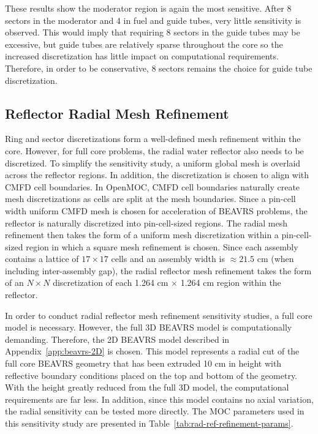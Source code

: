 These results show the moderator region is again the most sensitive. After 8 sectors in the moderator and 4 in fuel and guide tubes, very little sensitivity is observed. This would imply that requiring 8 sectors in the guide tubes may be excessive, but guide tubes are relatively sparse throughout the core so the increased discretization has little impact on computational requirements. Therefore, in order to be conservative, 8 sectors remains the choice for guide tube discretization.

\subsection{Reflector Radial Mesh Refinement}

Ring and sector discretizations form a well-defined mesh refinement within the core. However, for full core problems, the radial water reflector also needs to be discretized. To simplify the sensitivity study, a uniform global mesh is overlaid across the reflector regions. In addition, the discretization is chosen to align with \ac{CMFD} cell boundaries. In OpenMOC, \ac{CMFD} cell boundaries naturally create mesh discretizations as cells are split at the mesh boundaries. Since a pin-cell width uniform \ac{CMFD} mesh is chosen for acceleration of BEAVRS problems, the reflector is naturally discretized into pin-cell-sized regions. The radial mesh refinement then takes the form of a uniform mesh discretization within a pin-cell-sized region in which a square mesh refinement is chosen. Since each assembly contains a lattice of $17\times 17$ cells and an assembly width is $\approx 21.5$ cm (when including inter-assembly gap), the radial reflector mesh refinement takes the form of an $N \times N$ discretization of each 1.264 cm $\times$ 1.264 cm region within the reflector.

In order to conduct radial reflector mesh refinement sensitivity studies, a full core model is necessary. However, the full 3D BEAVRS model is computationally demanding. Therefore, the 2D BEAVRS model described in Appendix~\ref{app:beavrs-2D} is chosen. This model represents a radial cut of the full core BEAVRS geometry that has been extruded 10 cm in height with reflective boundary conditions placed on the top and bottom of the geometry. With the height greatly reduced from the full 3D model, the computational requirements are far less. In addition, since this model contains no axial variation, the radial sensitivity can be tested more directly. The \ac{MOC} parameters used in this sensitivity study are presented in Table~\ref{tab:rad-ref-refinement-params}.


